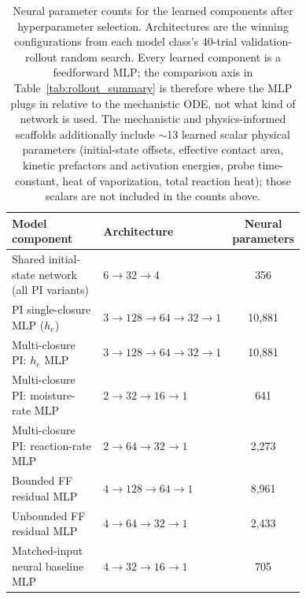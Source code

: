 \documentclass[fleqn,10pt]{wlscirep}
\begin{document}
\begin{table}[!htbp]
\centering
\small
\begin{tabular}{|p{0.36\linewidth}|p{0.38\linewidth}|c|}
\hline
Model component & Architecture & Neural parameters \\
\hline
Shared initial-state network (all PI variants) & $6 \rightarrow 32 \rightarrow 4$ & 356 \\
PI single-closure MLP ($h_e$) & $3 \rightarrow 128 \rightarrow 64 \rightarrow 32 \rightarrow 1$ & 10{,}881 \\
Multi-closure PI: $h_e$ MLP & $3 \rightarrow 128 \rightarrow 64 \rightarrow 32 \rightarrow 1$ & 10{,}881 \\
Multi-closure PI: moisture-rate MLP & $2 \rightarrow 32 \rightarrow 16 \rightarrow 1$ & 641 \\
Multi-closure PI: reaction-rate MLP & $2 \rightarrow 64 \rightarrow 32 \rightarrow 1$ & 2{,}273 \\
Bounded FF residual MLP & $4 \rightarrow 128 \rightarrow 64 \rightarrow 1$ & 8{,}961 \\
Unbounded FF residual MLP & $4 \rightarrow 64 \rightarrow 32 \rightarrow 1$ & 2{,}433 \\
Matched-input neural baseline MLP & $4 \rightarrow 32 \rightarrow 16 \rightarrow 1$ & 705 \\
\hline
\end{tabular}
\caption{Neural parameter counts for the learned components after hyperparameter selection. Architectures are the winning configurations from each model class's 40-trial validation-rollout random search. Every learned component is a feedforward MLP; the comparison axis in Table~\ref{tab:rollout_summary} is therefore where the MLP plugs in relative to the mechanistic ODE, not what kind of network is used. The mechanistic and physics-informed scaffolds additionally include $\sim$13 learned scalar physical parameters (initial-state offsets, effective contact area, kinetic prefactors and activation energies, probe time-constant, heat of vaporization, total reaction heat); those scalars are not included in the counts above.}
\label{tab:model_capacity}
\end{table}
\end{document}
